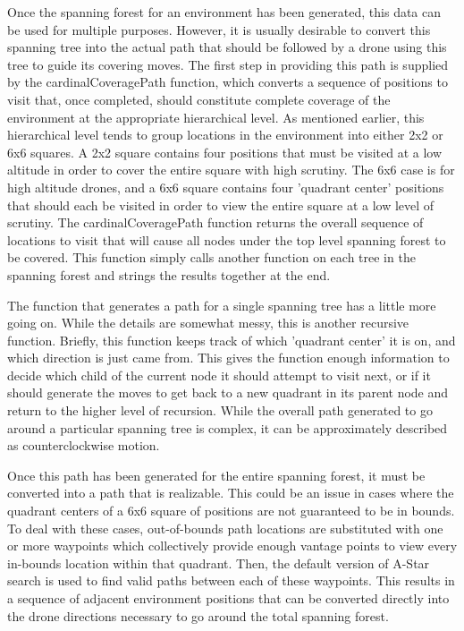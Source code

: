 Once the spanning forest for an environment has been generated, this data can be used for multiple purposes. However, it is usually desirable to convert this spanning tree into the actual path that should be followed by a drone using this tree to guide its covering moves. The first step in providing this path is supplied by the cardinalCoveragePath function, which converts a sequence of positions to visit that, once completed, should constitute complete coverage of the environment at the appropriate hierarchical level. As mentioned earlier, this hierarchical level tends to group locations in the environment into either 2x2 or 6x6 squares. A 2x2 square contains four positions that must be visited at a low altitude in order to cover the entire square with high scrutiny. The 6x6 case is for high altitude drones, and a 6x6 square contains four 'quadrant center' positions that should each be visited in order to view the entire square at a low level of scrutiny. The cardinalCoveragePath function returns the overall sequence of locations to visit that will cause all nodes under the top level spanning forest to be covered. This function simply calls another function on each tree in the spanning forest and strings the results together at the end.

The function that generates a path for a single spanning tree has a little more going on. While the details are somewhat messy, this is another recursive function. Briefly, this function keeps track of which 'quadrant center' it is on, and which direction is just came from. This gives the function enough information to decide which child of the current node it should attempt to visit next, or if it should generate the moves to get back to a new quadrant in its parent node and return to the higher level of recursion. While the overall path generated to go around a particular spanning tree is complex, it can be approximately described as counterclockwise motion.

Once this path has been generated for the entire spanning forest, it must be converted into a path that is realizable. This could be an issue in cases where the quadrant centers of a 6x6 square of positions are not guaranteed to be in bounds. To deal with these cases, out-of-bounds path locations are substituted with one or more waypoints which collectively provide enough vantage points to view every in-bounds location within that quadrant. Then, the default version of A-Star search is used to find valid paths between each of these waypoints. This results in a sequence of adjacent environment positions that can be converted directly into the drone directions necessary to go around the total spanning forest.

